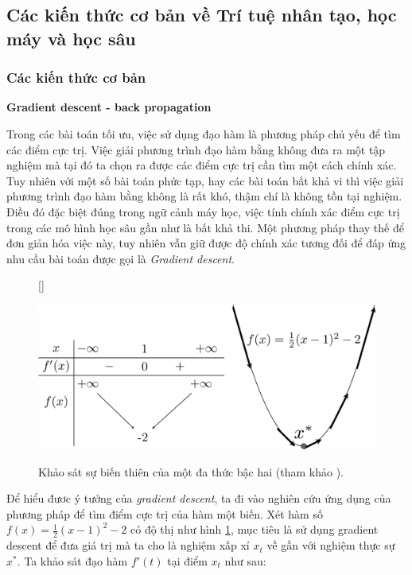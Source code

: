 \subsection{Các kiến thức cơ bản về  Trí tuệ nhân tạo, học máy và học sâu}
\subsubsection{Các kiến thức cơ bản}
\textbf{Gradient descent - back propagation}

Trong các bài toán tối ưu, việc sử dụng đạo hàm là phương pháp chủ yếu để tìm các điểm cực trị. Việc giải phương trình đạo hàm bằng không đưa ra một tập nghiệm mà tại đó ta chọn ra được các điểm cực trị cần tìm  một cách chính xác. Tuy nhiên với một số bài toán phức tạp, hay các bài toán bất khả vi thì việc giải phương trình đạo hàm bằng không là rất khó, thậm chí là không tồn tại nghiệm. Điều đó đặc biệt đúng trong ngữ cảnh máy học, việc tính chính xác điểm cực trị trong các mô hình học sâu gần như là bất khả thi. Một phương pháp thay thế  để đơn giản hóa việc này, tuy nhiên vẫn giữ được độ chính xác tương đối để đáp ứng nhu cầu bài toán được gọi là \textit{Gradient descent}.

\begin{figure}[!ht]
    [\FBwidth]
    {\caption{
            Khảo sát sự biến thiên của một đa thức bậc hai (tham khảo \cite{tiep2018machine}).
        }
        \label{fig:grad}}
    { %
        \includegraphics[width=.5\textwidth]{asset/pdf/gradient_descent.pdf}
    }
\end{figure}

Để  hiểu đươc ý tưởng của \textit{gradient descent}, ta đi vào nghiên cứu ứng dụng của phương pháp  để tìm điểm cực trị của hàm một biến. Xét hàm số $f(x) = \frac{1}{2}(x-1)^2 -2$ có độ thị như hình \ref{fig:grad}, mục tiêu là sử dụng gradient descent để đưa giá trị mà ta cho là nghiệm xấp xỉ $x_t$ về gần với nghiệm thực sự $x^*$. Ta khảo sát đạo hàm $f'(t)$ tại điểm $x_t$ như sau:

